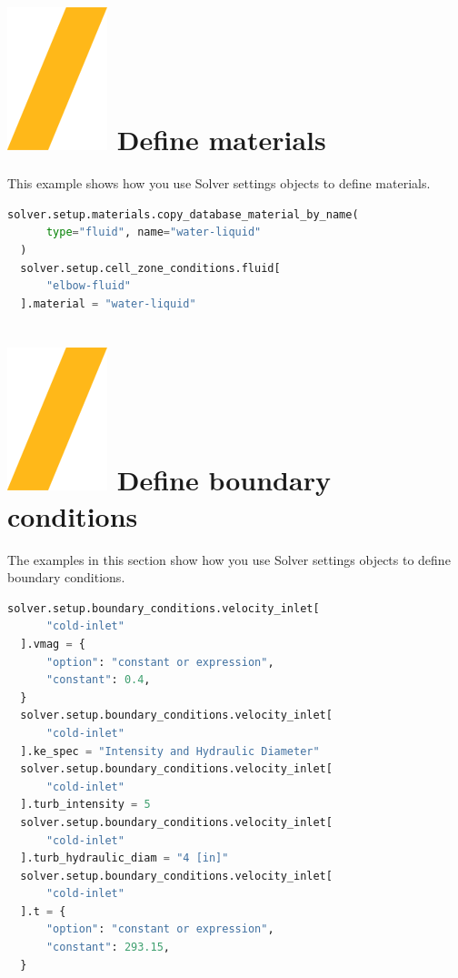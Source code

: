 \documentclass[9pt,landscape]{article}
\begin{document}
\begin{multicols}{3}
{%
\vfill
\section{\includegraphics[height=\fontcharht\font`\S]{slash.png}  Define materials}
This example shows how you use Solver settings objects to define materials.
\begin{lstlisting}[language=Python]
  solver.setup.materials.copy_database_material_by_name(
      type="fluid", name="water-liquid"
  )
  solver.setup.cell_zone_conditions.fluid[
      "elbow-fluid"
  ].material = "water-liquid"
\end{lstlisting} 

\section{\includegraphics[height=\fontcharht\font`\S]{slash.png}  Define boundary conditions}

The examples in this section show how you use Solver settings objects to define boundary conditions.

\begin{lstlisting}[language=Python]
  solver.setup.boundary_conditions.velocity_inlet[
      "cold-inlet"
  ].vmag = {
      "option": "constant or expression",
      "constant": 0.4,
  }
  solver.setup.boundary_conditions.velocity_inlet[
      "cold-inlet"
  ].ke_spec = "Intensity and Hydraulic Diameter"
  solver.setup.boundary_conditions.velocity_inlet[
      "cold-inlet"
  ].turb_intensity = 5
  solver.setup.boundary_conditions.velocity_inlet[
      "cold-inlet"
  ].turb_hydraulic_diam = "4 [in]"
  solver.setup.boundary_conditions.velocity_inlet[
      "cold-inlet"
  ].t = {
      "option": "constant or expression",
      "constant": 293.15,
  }
\end{lstlisting} 

}
\end{multicols}
\end{document}
